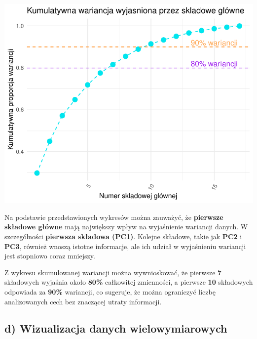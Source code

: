 \documentclass[
  12pt,
]{article}
\begin{document}
\begin{center}\includegraphics{Sprawozdanie2_files/figure-latex/Zmiennosc_skladowych_w_PCA-2} \end{center}

Na podstawie przedstawionych wykresów można zauważyć, że
\textbf{pierwsze składowe główne} mają największy wpływ na wyjaśnienie
wariancji danych. W szczególności \textbf{pierwsza składowa (PC1)}.
Kolejne składowe, takie jak \textbf{PC2} i \textbf{PC3}, również wnoszą
istotne informacje, ale ich udział w wyjaśnieniu wariancji jest
stopniowo coraz mniejszy.

Z wykresu skumulowanej wariancji można wywnioskować, że pierwsze
\textbf{7} składowych wyjaśnia około \textbf{80\%} całkowitej
zmienności, a pierwsze \textbf{10} składowych odpowiada za \textbf{90\%}
wariancji, co sugeruje, że można ograniczyć liczbę analizowanych cech
bez znaczącej utraty informacji.

\subsection{d) Wizualizacja danych
wielowymiarowych}\label{d-wizualizacja-danych-wielowymiarowych}
\end{document}
